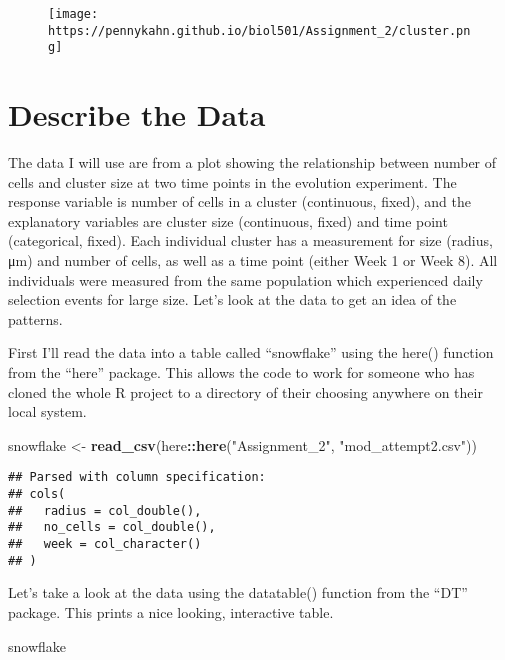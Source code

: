 \documentclass[]{article}
\newenvironment{Shaded}{\begin{snugshade}}{\end{snugshade}}
\newcommand{\KeywordTok}[1]{\textcolor[rgb]{0.13,0.29,0.53}{\textbf{#1}}}
\newcommand{\StringTok}[1]{\textcolor[rgb]{0.31,0.60,0.02}{#1}}
\newcommand{\OperatorTok}[1]{\textcolor[rgb]{0.81,0.36,0.00}{\textbf{#1}}}
\newcommand{\NormalTok}[1]{#1}
\begin{document}
\begin{figure}
\centering
\texttt{[image: https://pennykahn.github.io/biol501/Assignment\_2/cluster.png]}
\caption{}
\end{figure}

\section{Describe the Data}\label{describe-the-data}

The data I will use are from a plot showing the relationship between
number of cells and cluster size at two time points in the evolution
experiment. The response variable is number of cells in a cluster
(continuous, fixed), and the explanatory variables are cluster size
(continuous, fixed) and time point (categorical, fixed). Each individual
cluster has a measurement for size (radius, μm) and number of cells, as
well as a time point (either Week 1 or Week 8). All individuals were
measured from the same population which experienced daily selection
events for large size. Let's look at the data to get an idea of the
patterns.

First I'll read the data into a table called ``snowflake'' using the
here() function from the ``here'' package. This allows the code to work
for someone who has cloned the whole R project to a directory of their
choosing anywhere on their local system.

\begin{Shaded}
\begin{Highlighting}[]
\NormalTok{snowflake <-}\StringTok{ }\KeywordTok{read_csv}\NormalTok{(here}\OperatorTok{::}\KeywordTok{here}\NormalTok{(}\StringTok{"Assignment_2"}\NormalTok{, }\StringTok{"mod_attempt2.csv"}\NormalTok{))}
\end{Highlighting}
\end{Shaded}

\begin{verbatim}
## Parsed with column specification:
## cols(
##   radius = col_double(),
##   no_cells = col_double(),
##   week = col_character()
## )
\end{verbatim}

Let's take a look at the data using the datatable() function from the
``DT'' package. This prints a nice looking, interactive table.

\begin{Shaded}
\begin{Highlighting}[]
\NormalTok{snowflake}
\end{Highlighting}
\end{Shaded}
\end{document}

